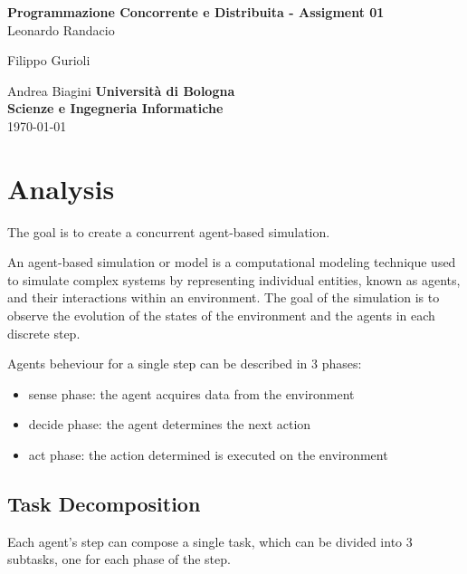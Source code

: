 \documentclass[12pt, a4paper]{report}
\begin{document}
\renewcommand\bibname{References} %


\begin{titlepage}

\begin{center}

\Large \textbf {Programmazione Concorrente e Distribuita - Assigment 01}\\%
\vspace{1em}%
\vfill
Leonardo Randacio


Filippo Gurioli


Andrea Biagini
\vspace{1em}
\vfill
{\bf Università di Bologna \\ Scienze e Ingegneria Informatiche}\\[0.5in]

       
\vfill
\today

\end{center}

\end{titlepage}


\tableofcontents
\listoffigures
\listoftables

\newpage
{} %

\chapter{Analysis}
The goal is to create a concurrent agent-based simulation.

An agent-based simulation or model is a computational modeling
 technique used to simulate complex systems by representing individual
 entities, known as agents, and their interactions within an environment.
 The goal of the simulation is to observe the evolution of the states of the
 environment and the agents in each discrete step.

Agents beheviour for a single step can be described in 3 phases:
\begin{itemize}
   \item sense phase: the agent acquires data from the environment
   \item decide phase: the agent determines the next action
   \item act phase: the action determined is executed on the environment
\end{itemize}

\section{Task Decomposition}
Each agent's step can compose a single task, which can be divided into 3 subtasks,
 one for each phase of the step. 
\end{document}
